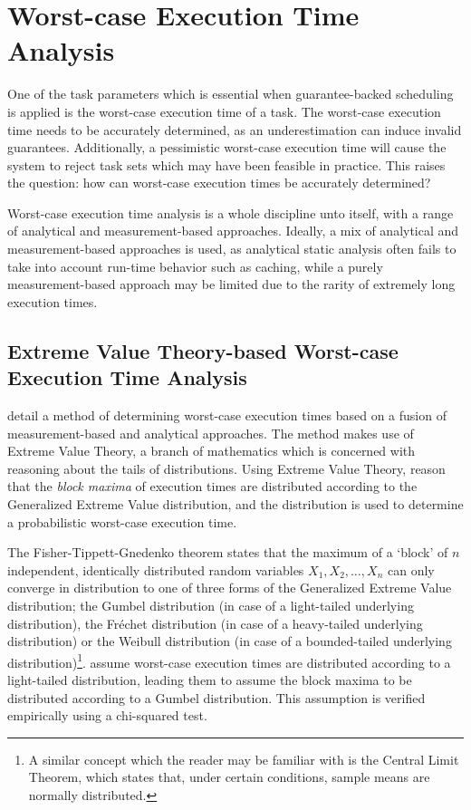 \documentclass[twoside]{uva-inf-bachelor-thesis}
\begin{document}
\section{Worst-case Execution Time Analysis}
One of the task parameters which is essential when guarantee-backed scheduling is applied is the worst-case execution time of a task. The worst-case execution time needs to be accurately determined, as an underestimation can induce invalid guarantees. Additionally, a pessimistic worst-case execution time will cause the system to reject task sets which may have been feasible in practice. This raises the question: how can worst-case execution times be accurately determined?

Worst-case execution time analysis is a whole discipline unto itself, with a range of analytical and measurement-based approaches. Ideally, a mix of analytical and measurement-based approaches is used, as analytical static analysis often fails to take into account run-time behavior such as caching, while a purely measurement-based approach may be limited due to the rarity of extremely long execution times.

\subsection{Extreme Value Theory-based Worst-case Execution Time Analysis}

\textcite{hansen_et_al:wcet} detail a method of determining worst-case execution times based on a fusion of measurement-based and analytical approaches. The method makes use of Extreme Value Theory, a branch of mathematics which is concerned with reasoning about the tails of distributions. Using Extreme Value Theory, \citeauthor*{hansen_et_al:wcet} reason that the \emph{block maxima} of execution times are distributed according to the Generalized Extreme Value distribution, and the distribution is used to determine a probabilistic worst-case execution time.

The Fisher-Tippett-Gnedenko theorem states that the maximum of a `block' of $n$ independent, identically distributed random variables $X_1, X_2, \ldots, X_n$ can only converge in distribution to one of three forms of the Generalized Extreme Value distribution; the Gumbel distribution (in case of a light-tailed underlying distribution), the Fréchet distribution (in case of a heavy-tailed underlying distribution) or the Weibull distribution (in case of a bounded-tailed underlying distribution)\footnote{A similar concept which the reader may be familiar with is the Central Limit Theorem, which states that, under certain conditions, sample means are normally distributed.}. \citeauthor*{hansen_et_al:wcet} assume worst-case execution times are distributed according to a light-tailed distribution, leading them to assume the block maxima to be distributed according to a Gumbel distribution. This assumption is verified empirically using a chi-squared test.
\end{document}
